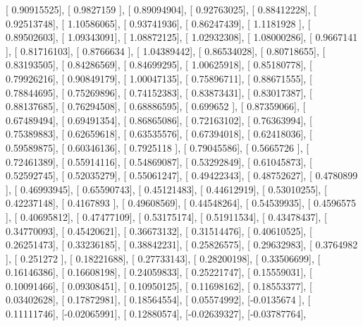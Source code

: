 \documentclass{article}
\begin{document}
       [ 0.90915525],
       [ 0.9827159 ],
       [ 0.89094904],
       [ 0.92763025],
       [ 0.88412228],
       [ 0.92513748],
       [ 1.10586065],
       [ 0.93741936],
       [ 0.86247439],
       [ 1.1181928 ],
       [ 0.89502603],
       [ 1.09343091],
       [ 1.08872125],
       [ 1.02932308],
       [ 1.08000286],
       [ 0.9667141 ],
       [ 0.81716103],
       [ 0.8766634 ],
       [ 1.04389442],
       [ 0.86534028],
       [ 0.80718655],
       [ 0.83193505],
       [ 0.84286569],
       [ 0.84699295],
       [ 1.00625918],
       [ 0.85180778],
       [ 0.79926216],
       [ 0.90849179],
       [ 1.00047135],
       [ 0.75896711],
       [ 0.88671555],
       [ 0.78844695],
       [ 0.75269896],
       [ 0.74152383],
       [ 0.83873431],
       [ 0.83017387],
       [ 0.88137685],
       [ 0.76294508],
       [ 0.68886595],
       [ 0.699652  ],
       [ 0.87359066],
       [ 0.67489494],
       [ 0.69491354],
       [ 0.86865086],
       [ 0.72163102],
       [ 0.76363994],
       [ 0.75389883],
       [ 0.62659618],
       [ 0.63535576],
       [ 0.67394018],
       [ 0.62418036],
       [ 0.59589875],
       [ 0.60346136],
       [ 0.7925118 ],
       [ 0.79045586],
       [ 0.5665726 ],
       [ 0.72461389],
       [ 0.55914116],
       [ 0.54869087],
       [ 0.53292849],
       [ 0.61045873],
       [ 0.52592745],
       [ 0.52035279],
       [ 0.55061247],
       [ 0.49422343],
       [ 0.48752627],
       [ 0.4780899 ],
       [ 0.46993945],
       [ 0.65590743],
       [ 0.45121483],
       [ 0.44612919],
       [ 0.53010255],
       [ 0.42237148],
       [ 0.4167893 ],
       [ 0.49608569],
       [ 0.44548264],
       [ 0.54539935],
       [ 0.4596575 ],
       [ 0.40695812],
       [ 0.47477109],
       [ 0.53175174],
       [ 0.51911534],
       [ 0.43478437],
       [ 0.34770093],
       [ 0.45420621],
       [ 0.36673132],
       [ 0.31514476],
       [ 0.40610525],
       [ 0.26251473],
       [ 0.33236185],
       [ 0.38842231],
       [ 0.25826575],
       [ 0.29632983],
       [ 0.3764982 ],
       [ 0.251272  ],
       [ 0.18221688],
       [ 0.27733143],
       [ 0.28200198],
       [ 0.33506699],
       [ 0.16146386],
       [ 0.16608198],
       [ 0.24059833],
       [ 0.25221747],
       [ 0.15559031],
       [ 0.10091466],
       [ 0.09308451],
       [ 0.10950125],
       [ 0.11698162],
       [ 0.18553377],
       [ 0.03402628],
       [ 0.17872981],
       [ 0.18564554],
       [ 0.05574992],
       [-0.0135674 ],
       [ 0.11111746],
       [-0.02065991],
       [ 0.12880574],
       [-0.02639327],
       [-0.03787764],
\end{document}
